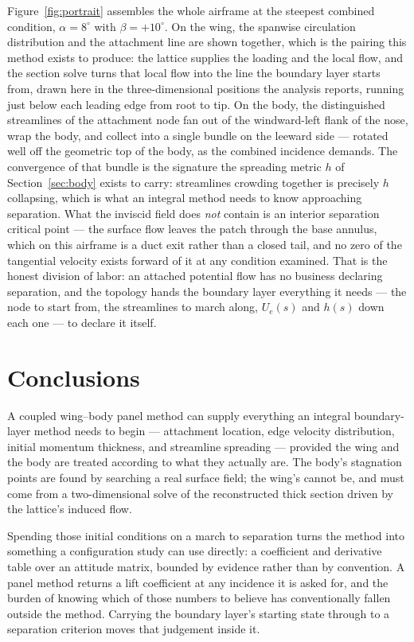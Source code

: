 \documentclass[submit]{aiaa-tc}%
\begin{document}
Figure~\ref{fig:portrait} assembles the whole airframe at the
steepest combined condition, $\alpha = 8^\circ$ with $\beta =
+10^\circ$. On the wing, the spanwise circulation distribution and
the attachment line are shown together, which is the pairing this
method exists to produce: the lattice supplies the loading and the
local flow, and the section solve turns that local flow into the line
the boundary layer starts from, drawn here in the three-dimensional
positions the analysis reports, running just below each leading edge
from root to tip. On the body, the distinguished streamlines of the attachment node fan
out of the windward-left flank of the nose, wrap the body, and
collect into a single bundle on the leeward side --- rotated well off
the geometric top of the body, as the combined incidence demands. The
convergence of that bundle is the signature the spreading metric $h$
of Section~\ref{sec:body} exists to carry: streamlines crowding
together is precisely $h$ collapsing, which is what an integral
method needs to know approaching separation. What the inviscid field
does \emph{not} contain is an interior separation critical point ---
the surface flow leaves the patch through the base annulus, which on
this airframe is a duct exit rather than a closed tail, and no zero
of the tangential velocity exists forward of it at any condition
examined. That is the honest division of labor: an attached potential
flow has no business declaring separation, and the topology hands the
boundary layer everything it needs --- the node to start from, the
streamlines to march along, $U_e(s)$ and $h(s)$ down each one --- to
declare it itself.

\section{Conclusions}

A coupled wing--body panel method can supply everything an integral
boundary-layer method needs to begin --- attachment location, edge
velocity distribution, initial momentum thickness, and streamline
spreading --- provided the wing and the body are treated according to what
they actually are. The body's stagnation points are found by searching a
real surface field; the wing's cannot be, and must come from a
two-dimensional solve of the reconstructed thick section driven by the
lattice's induced flow.

Spending those initial conditions on a march to separation turns the
method into something a configuration study can use directly: a
coefficient and derivative table over an attitude matrix, bounded by
evidence rather than by convention. A panel method returns a lift
coefficient at any incidence it is asked for, and the burden of knowing
which of those numbers to believe has conventionally fallen outside the
method. Carrying the boundary layer's starting state through to a
separation criterion moves that judgement inside it.
\end{document}
